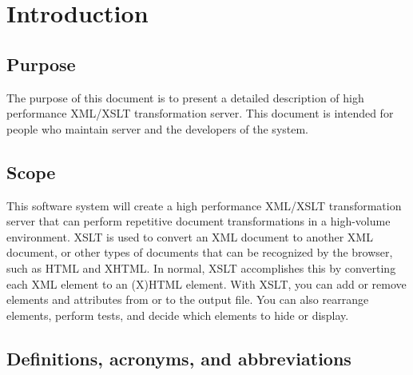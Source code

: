 \section{Introduction}

\subsection{Purpose}

The purpose of this document is to present a detailed description of high performance XML/XSLT transformation server.
This document is intended for people who maintain server and the developers of the system.

\subsection{Scope}

This software system will create a high performance XML/XSLT transformation server that can perform repetitive document transformations in a high-volume environment.
XSLT is used to convert an XML document to another XML document, or other types of documents that can be recognized by the browser, such as HTML and XHTML.
In normal, XSLT accomplishes this by converting each XML element to an (X)HTML element.
With XSLT, you can add or remove elements and attributes from or to the output file.
You can also rearrange elements, perform tests, and decide which elements to hide or display.

\subsection{Definitions, acronyms, and abbreviations}

